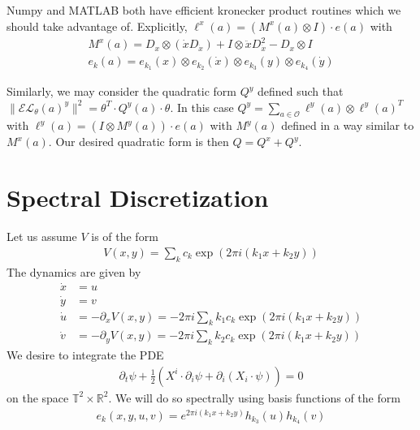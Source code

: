 \documentclass[12pt]{amsart}
\begin{document}
Numpy and MATLAB both have efficient kronecker product routines which we should take advantage of.
Explicitly, $\ell^x(a) = (M^x(a) \otimes I) \cdot e(a)$ with
\begin{align*}
	M^x(a) = D_x \otimes ( \dot{x} D_{\dot{x}}) + I \otimes \ddot{x} D_{\dot{x}}^2 - D_x \otimes I \\
	e_k(a) = e_{k_1}(x) \otimes e_{k_2}(\dot{x}) \otimes e_{k_3}(y) \otimes e_{k_4}(\dot{y}) 
\end{align*}

Similarly, we may consider the quadratic form $Q^y$ defined such that $\| \mathcal{EL}_\theta(a)^y \|^2 = \theta^T \cdot Q^y(a) \cdot \theta$.
In this case $Q^y = \sum_{a \in \mathcal{O}} \ell^y(a) \otimes \ell^y(a)^T$ with $\ell^y(a) = (I \otimes M^y(a) ) \cdot e(a)$ with $M^y(a)$ defined in a way similar to $M^x(a)$.
Our desired quadratic form is then $Q = Q^x + Q^y$.

\section{Spectral Discretization}
\label{sec:spectral}
Let us assume $V$ is of the form
\begin{align*}
	V(x,y) = \sum_k c_k \exp \left( 2\pi i ( k_1 x + k_2 y) \right)
\end{align*}
The dynamics are given by
\begin{align*}
	\dot{x} &= u \\
	\dot{y} &= v \\
	\dot{u} &= - \partial_x V(x,y) = -2\pi i \sum_k k_1 c_k \exp \left( 2\pi i ( k_1 x + k_2 y) \right)  \\
	\dot{v} &= - \partial_y V(x,y) = -2\pi i \sum_k k_2 c_k \exp \left( 2\pi i ( k_1 x + k_2 y) \right)
\end{align*}
We desire to integrate the PDE
\begin{align*}
	\partial_t \psi + \frac{1}{2} \left(  X^i \cdot \partial_i \psi + \partial_i (X_i \cdot \psi) \right) = 0
\end{align*}
on the space $\mathbb{T}^2 \times \mathbb{R}^2$.
We will do so spectrally using basis functions of the form
\begin{align*}
	e_{k}(x,y,u,v) = e^{ 2\pi i( k_1 x+k_2 y) } h_{k_3}(u) h_{k_4}(v)
\end{align*}
\end{document}
